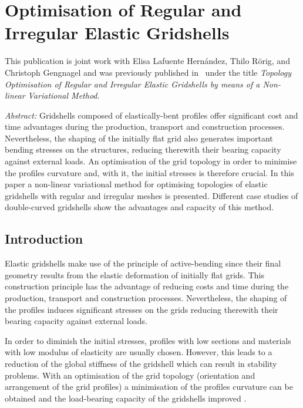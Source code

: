 \documentclass[Thesis.tex]{subfiles}
\begin{document}
\chapter{Optimisation of Regular and Irregular Elastic Gridshells}

This publication is joint work with Elisa Lafuente Hern\'andez, Thilo R\"orig, and Christoph Gengnagel and was
previously published in~\cite{Lafuente2012} under the title \emph{Topology Optimisation of Regular and Irregular Elastic Gridshells by means of a Non-linear Variational Method}.

\emph{Abstract:}
Gridshells composed of elastically-bent profiles offer significant cost and time advantages during the production, transport and construction processes. Nevertheless, the shaping of the initially flat grid also generates important bending stresses on the structures, reducing therewith their bearing capacity against external loads. An optimisation of the grid topology in order to minimise the profiles curvature and, with it, the initial stresses is therefore crucial. In this paper a non-linear variational method for optimising topologies of elastic gridshells with regular and irregular meshes is presented. Different case studies of double-curved gridshells show the advantages and capacity of this method.  

\section{Introduction}

Elastic gridshells make use of the principle of active-bending \cite{AlpermannLG2012} since their final geometry results from the elastic deformation of initially flat grids. This construction principle has the advantage of reducing costs and time during the production, transport and construction processes. Nevertheless, the shaping of the profiles induces significant stresses on the grids reducing therewith their bearing capacity against external loads.  

In order to diminish the initial stresses, profiles with low sections and materials with low modulus of elasticity are usually chosen. However, this leads to a reduction of the global stiffness of the gridshell which can result in stability problems. With an optimisation of the grid topology (orientation and arrangement of the grid profiles) a minimisation of the profiles curvature can be obtained and the load-bearing capacity of the gridshells improved \cite{Lafuente2011}.  
\end{document}

